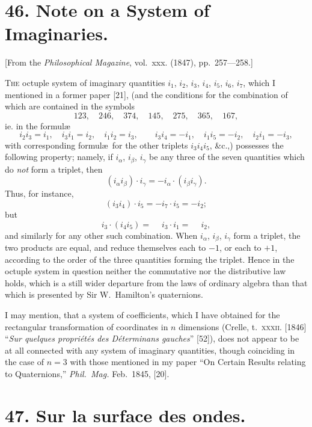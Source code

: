 \documentclass[11pt,a4paper]{book}
\begin{document}
\newpage


\section*{46. Note on a System of Imaginaries.}

[From the \textit{Philosophical Magazine}, vol.~xxx. (1847), pp.~257---258.]

\bigskip

\textsc{The} octuple system of imaginary quantities $i_1$, $i_2$, $i_3$, $i_4$, $i_5$, $i_6$, $i_7$, which I mentioned in a former paper [21], (and the conditions for the combination of which are contained in the symbols
\[
123,\quad 246,\quad 374,\quad 145,\quad 275,\quad 365,\quad 167,
\]
ie. in the formul\ae
\[
i_2 i_3 = i_1,\quad i_3 i_1 = i_2,\quad i_1 i_2 = i_3,\qquad i_3 i_4 = -i_1,\quad i_1 i_5 = -i_2,\quad i_2 i_1 = -i_3,
\]
with corresponding formul\ae\ for the other triplets $i_3 i_4 i_5$, \&c.,) possesses the following property; namely, if $i_\alpha$, $i_\beta$, $i_\gamma$ be any three of the seven quantities which do \textit{not} form a triplet, then
\[
(i_\alpha i_\beta) \cdot i_\gamma = -i_\alpha \cdot (i_\beta i_\gamma).
\]
Thus, for instance,
\[
(i_3 i_4) \cdot i_5 = -i_7 \cdot i_5 = -i_2;
\]
but
\[
i_3 \cdot (i_4 i_5) = \phantom{-}i_3 \cdot i_1 = \phantom{-}i_2,
\]
and similarly for any other such combination. When $i_\alpha$, $i_\beta$, $i_\gamma$ form a triplet, the two products are equal, and reduce themselves each to $-1$, or each to $+1$, according to the order of the three quantities forming the triplet. Hence in the octuple system in question neither the commutative nor the distributive law holds, which is a still wider departure from the laws of ordinary algebra than that which is presented by Sir W.~Hamilton's quaternions.

I may mention, that a system of coefficients, which I have obtained for the rectangular transformation of coordinates in $n$ dimensions (Crelle, t.~\textsc{xxxii}. [1846] ``\textit{Sur quelques propri\'et\'es des D\'eterminans gauches}'' [52]), does not appear to be at all connected with any system of imaginary quantities, though coinciding in the case of $n=3$ with those mentioned in my paper ``On Certain Results relating to Quaternions,'' \textit{Phil.~Mag.} Feb.~1845, [20].

\newpage


\section*{47. Sur la surface des ondes.}
\end{document}
